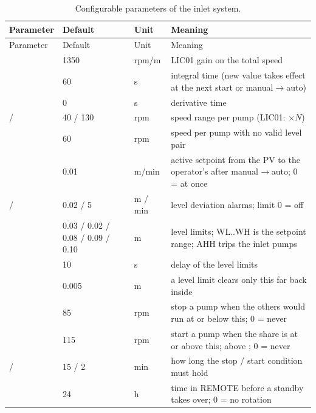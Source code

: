 \documentclass[11pt,a4paper]{article}
\begin{document}
\begin{small}
\begin{longtable}{@{}P{58mm}P{24mm}P{10mm}P{55mm}@{}}
\caption{Configurable parameters of the inlet system.}\label{tab:params}\\
\toprule
Parameter & Default & Unit & Meaning \\
\midrule
\endfirsthead
\toprule
Parameter & Default & Unit & Meaning \\
\midrule
\endhead
\bottomrule
\endfoot
{} & 1350 & rpm/m & LIC01 gain on the total speed \\
 & 60 & s & integral time (new value takes effect at the next start or manual$\to$auto) \\
 & 0 & s & derivative time \\
 /  & 40 / 130 & rpm & speed range per pump (LIC01: $\times N$) \\
 & 60 & rpm & speed per pump with no valid level pair \\
 & 0.01 & m/min & active setpoint from the PV to the operator's after manual$\to$auto; 0 = at once \\
 /  & 0.02 / 5 & m / min & level deviation alarms; limit 0 = off \\
 & 0.03 / 0.02 / 0.08 / 0.09 / 0.10 & m & level limits; WL..WH is the setpoint range; AHH trips the inlet pumps \\
 & 10 & s & delay of the level limits \\
 & 0.005 & m & a level limit clears only this far back inside \\
 & 85 & rpm & stop a pump when the others would run at or below this; 0 = never \\
 & 115 & rpm & start a pump when the share is at or above this; above ; 0 = never \\
 /  & 15 / 2 & min & how long the stop / start condition must hold \\
 & 24 & h & time in REMOTE before a standby takes over; 0 = no rotation \\

\end{longtable}
\end{small}
\end{document}
